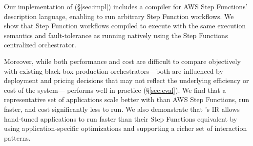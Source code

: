 

Our implementation of \name{} (\S\ref{sec:impl}) includes a compiler for AWS Step
Functions' description language, enabling \name{} to run arbitrary Step Function
workflows.  We show that Step Function workflows compiled to \name{} execute
with the same execution semantics and fault-tolerance as running natively using
the Step Functions centralized orchestrator.

Moreover, while both performance and cost are difficult to compare objectively
with existing black-box production orchestrators---both are influenced by
deployment and pricing decisions that may not reflect the underlying efficiency
or cost of the system---\name{} performs well in practice (\S\ref{sec:eval}). We
find that a representative set of applications scale better with \name{} than
AWS Step Functions, run faster, and cost significantly less to run. We also
demonstrate that \name{}'s IR allows hand-tuned applications to run faster than
their Step Functions equivalent by using application-specific optimizations and
supporting a richer set of interaction patterns.
